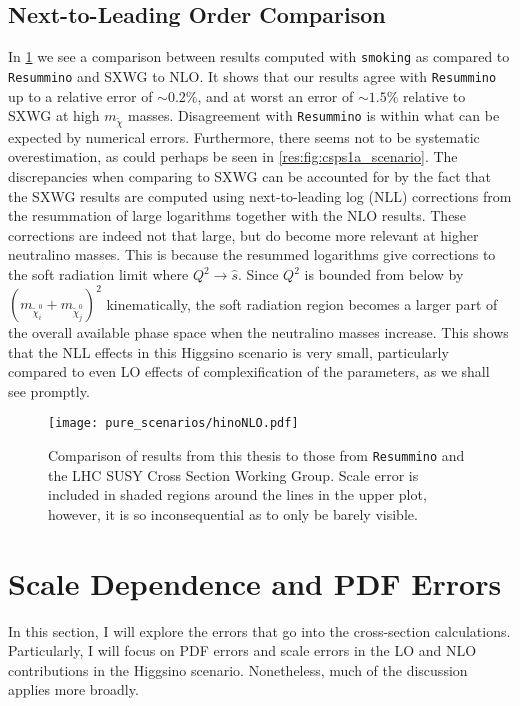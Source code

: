 \documentclass[../main.tex]{subfiles}
\begin{document}
\subsection{Next-to-Leading Order Comparison}
In \cref{res:fig:hino_comparison} we see a comparison between results computed with \verb|smoking| as compared to \verb|Resummino| and SXWG to NLO\@.
It shows that our results agree with \verb|Resummino| up to a relative error of \(\sim 0.2\%\), and at worst an error of \(\sim 1.5\%\) relative to SXWG at high \(m_{\tilde\chi}\) masses.
Disagreement with \verb|Resummino| is within what can be expected by numerical errors.
Furthermore, there seems not to be systematic overestimation, as could perhaps be seen in \cref{res:fig:csps1a_scenario}.
The discrepancies when comparing to SXWG can be accounted for by the fact that the SXWG results are computed using next-to-leading log (NLL) corrections from the resummation of large logarithms together with the NLO results.
These corrections are indeed not that large, but do become more relevant at higher neutralino masses.
This is because the resummed logarithms give corrections to the soft radiation limit where \(Q^2 \to \hat{s}\).
Since \(Q^2\) is bounded from below by \((m_{\tilde\chi^0_i} + m_{\tilde\chi^0_j})^2\) kinematically, the soft radiation region becomes a larger part of the overall available phase space when the neutralino masses increase.
This shows that the NLL effects in this Higgsino scenario is very small, particularly compared to even LO effects of complexification of the parameters, as we shall see promptly.


\begin{figure}[ht!]
  \centering
  \texttt{[image: pure\_scenarios/hinoNLO.pdf]}
  \caption{Comparison of results from this thesis to those from \texttt{Resummino} and the LHC SUSY Cross Section Working Group.
    Scale error is included in shaded regions around the lines in the upper plot, however, it is so inconsequential as to only be barely visible.}
  \label{res:fig:hino_comparison}
\end{figure}


\section{Scale Dependence and PDF Errors}
In this section, I will explore the errors that go into the cross-section calculations.
Particularly, I will focus on PDF errors and scale errors in the LO and NLO contributions in the Higgsino scenario.
Nonetheless, much of the discussion applies more broadly.
\end{document}
